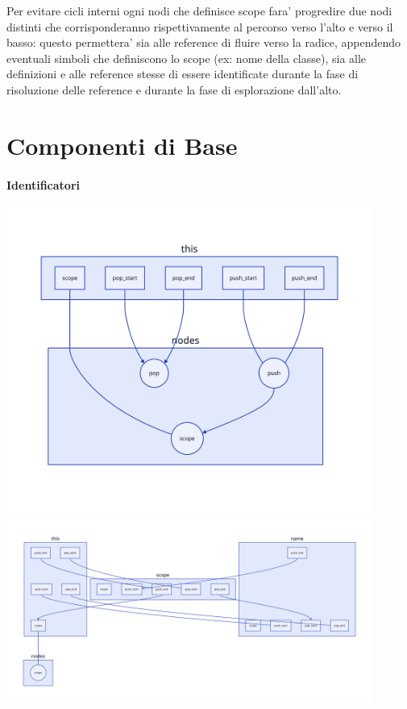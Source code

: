 Per evitare cicli interni ogni nodi che definisce scope fara' progredire due nodi distinti che corrisponderanno rispettivamente al percorso verso l'alto e verso il basso: questo permettera' sia alle reference di fluire verso la radice, appendendo eventuali simboli che definiscono lo scope (ex: nome della classe), sia alle definizioni e alle reference stesse di essere identificate durante la fase di risoluzione delle reference e durante la fase di esplorazione dall'alto.

\section{Componenti di Base}

\paragraph{Identificatori}

\includegraphics[width=12cm]{diagrams/04/identifier.svg}
\includegraphics[width=12cm]{diagrams/04/scoped_identifier.svg}

